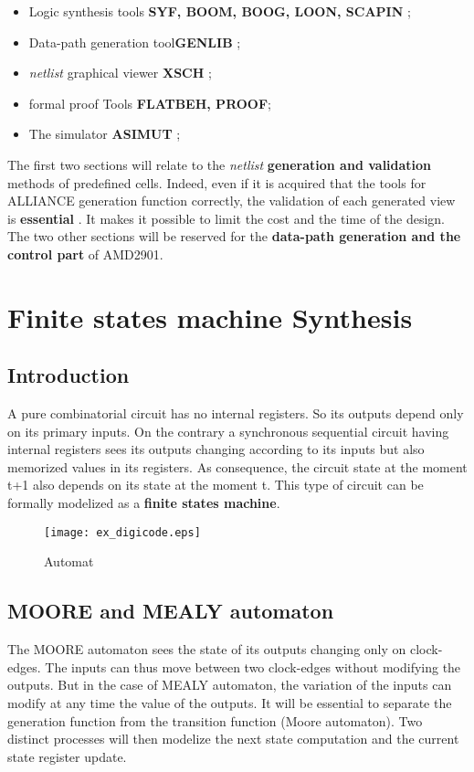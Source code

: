 \documentclass{article}
\begin{document}
{\begin{itemize}\itemsep=-.8ex
\item   Logic synthesis tools { \bf SYF, BOOM, BOOG, LOON, SCAPIN };
\item   Data-path generation tool{\bf GENLIB };
\item   { \it netlist } graphical viewer  { \bf XSCH };
\item   formal proof Tools {\bf FLATBEH, PROOF};
\item   The simulator { \bf ASIMUT };
\end{itemize}

The first two sections will relate to the { \it netlist } { \bf
generation and validation } methods of predefined cells. Indeed,
even if it is acquired that the tools for ALLIANCE generation
function correctly, the validation of each generated view is { \bf
essential }. It makes it possible to limit
the cost and the time of the design.  \\
The two other sections will be reserved for the { \bf data-path
generation and the control part } of AMD2901.

\section{Finite states machine Synthesis}

\subsection{Introduction}

A pure combinatorial circuit has no internal registers. So
its outputs depend only on its primary inputs. On the contrary 
a synchronous sequential circuit having internal registers sees its
outputs changing according to its inputs but also memorized values
in its registers. As consequence, the circuit state at the moment
t+1 also depends on its state at the moment t. This type of
circuit can be formally modelized as a { \bf finite states machine}.

\begin{figure}[H]\centering
  \texttt{[image: ex\_digicode.eps]}
 \caption{Automat}
  \label{Fig:ex_digicode}
\end{figure}

\subsection{MOORE and MEALY automaton}
The MOORE automaton sees the state of its outputs changing only on
clock-edges. The inputs can thus move between two clock-edges
without modifying the outputs. But in the case of MEALY automaton,
the variation of the inputs can modify at any time the value of
the outputs. It will be essential to separate the generation
function from the transition function (Moore automaton).
Two distinct processes will then modelize the next state computation
and the current state register update.

}
\end{document}
